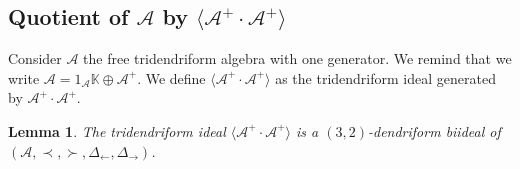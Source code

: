 \documentclass[pdftex]{sigma}
\numberwithin{equation}{section}
\theoremstyle{definition}
\theoremstyle{plain}
\newtheorem{Lemme}[defi]{Lemma}
\newcommand{\K}{\mathbb{K}}
\begin{document}
\subsection[Quotient of A by langle A\^{}+ cdot A\^{}+ rangle]{Quotient of $\boldsymbol{\mathcal{A}}$ by $\boldsymbol{\big\langle \mathcal{A}^+\cdot \mathcal{A}^+ \big\rangle}$}

Consider $\mathcal{A}$ the free tridendriform algebra with one generator. We remind that we write $\mathcal{A}=1_\mathcal{A}\K\oplus \mathcal{A}^+$.
We define $\big\langle \mathcal{A}^+\cdot \mathcal{A}^+ \big\rangle$ as the tridendriform ideal generated by $\mathcal{A}^+\cdot \mathcal{A}^+.$
\begin{Lemme}
	 The tridendriform ideal $\big\langle \mathcal{A}^+\cdot \mathcal{A}^+ \big\rangle$ is a $(3,2)$-dendriform biideal of $(\mathcal{A},\prec,\succ,\allowbreak \Delta_{\leftarrow},\Delta_{\rightarrow})$.
\end{Lemme}
\end{document}
